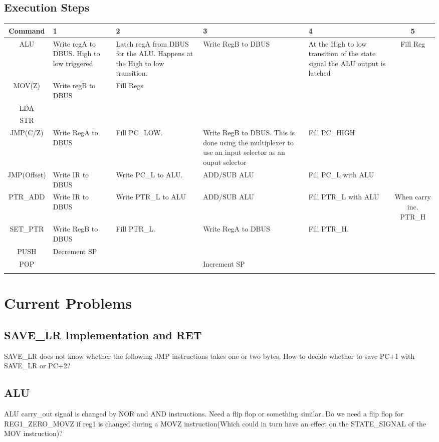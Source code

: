 \documentclass[a4paper, 12pt]{article}
\begin{document}
	\subsection{Execution Steps}
	{\tiny
	\begin{center}
		\begin{tabular}{|c|p{2cm}|p{3cm}|p{3cm}|p{2cm}|c|}
			\hline
			Command & 1 & 2 & 3 & 4 & 5 \\ \hline
			ALU & Write regA to DBUS. High to low triggered & Latch regA from DBUS for the ALU. Happens at the High to low transition. & Write RegB to DBUS & At the High to low transition of the state signal the ALU output is latched & Fill Reg\\ \hline
			MOV(Z) & Write regB to DBUS & Fill Regs & & &\\ \hline
			LDA & & & & & \\ \hline
			STR & & & & & \\ \hline
			JMP(C/Z) & Write RegA to DBUS & Fill PC\_LOW. & Write RegB to DBUS. This is done using the multiplexer to use an input selector as an ouput selector & Fill PC\_HIGH & \\ \hline
			JMP(Offset) & Write IR to DBUS & Write PC\_L to ALU. & ADD/SUB ALU & Fill PC\_L with ALU & \\ \hline
			PTR\_ADD & Write IR to DBUS & Write PTR\_L to ALU & ADD/SUB ALU& Fill PTR\_L with ALU & When carry inc. PTR\_H\\ \hline
			SET\_PTR & Write RegB to DBUS & Fill PTR\_L. & Write RegA to DBUS & Fill PTR\_H. & \\ \hline
			PUSH & Decrement SP & & & & \\ \hline
			POP & & & Increment SP & & \\ \hline
			& & & & & \\ \hline
		\end{tabular}
	\end{center}
	}
	\newpage
	\section{Current Problems}
	\subsection{SAVE\_LR Implementation and RET}
	SAVE\_LR does not know whether the following JMP instructions takes one or two bytes. How to decide whether to save PC+1 with SAVE\_LR or PC+2?
	\subsection{ALU}
	ALU carry\_out signal is changed by NOR and AND instructions. Need a flip flop or something similar.
	Do we need a flip flop for REG1\_ZERO\_MOVZ if reg1 is changed during a MOVZ instruction(Which could in turn have an effect on the STATE\_SIGNAL of the MOV instruction)?
\end{document}
